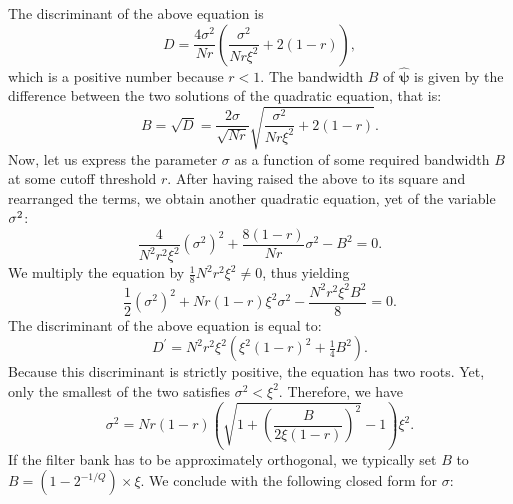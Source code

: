 \documentclass[smallextended]{svjour3}
\begin{document}
The discriminant of the above equation is
\[
D=\dfrac{4\sigma^2}{Nr}
\left(
\dfrac{\sigma^2}{Nr\xi^2}
+
2(1-r)
\right),
\]
which is a positive number because $r<1$.
The bandwidth $B$ of $\boldsymbol{\hat{\psi}}$ is given by the difference between the two solutions of the quadratic equation, that is:
\[
B = 
\sqrt{D} =
\dfrac{2\sigma}{\sqrt{N r}}
\sqrt{\dfrac{\sigma^2}{N r \xi^2} + 2 (1-r)}
.
\]
Now, let us express the parameter $\sigma$ as a function of some
required bandwidth $B$ at some cutoff threshold $r$. After having
raised the above to its square and rearranged the terms, we obtain
another quadratic equation, yet of the variable $\mbox{\ensuremath{\sigma}}^{2}$:
\[
\dfrac{4}{N^2 r^2 \xi^2} (\sigma^2)^2 + \dfrac{8 (1-r)}{N r} \sigma^2 - B^2 = 0.
\]
We multiply the equation by $\tfrac{1}{8} N^2 r^2 \xi^2 \neq 0$, thus yielding
\[
\dfrac{1}{2} (\sigma^2)^2
+
N r (1-r) \xi^2 \sigma^2
-
\dfrac{N^2 r^2 \xi^2 B^2}{8}
= 0.
\]
The discriminant of the above equation is equal to:
\[
D^\prime = N^2 r^2 \xi^2 \left(\xi^2 (1-r)^2 + \tfrac{1}{4}B^2\right).
\]
Because this discriminant is strictly positive, the equation has two roots.
Yet, only the smallest of the two satisfies $\sigma^2 < \xi^2$.
Therefore, we have
\[
\sigma^{2}=
N r (1-r)
\left(
\sqrt{1 + \left(\dfrac{B}{2\xi (1-r)}\right)^2}
- 1\right) \xi^2 
.
\]
If the filter bank has to be approximately orthogonal, we typically
set $B$ to $B=\left(1-2^{-1/Q}\right)\times\xi$.
We conclude with the following closed form for $\sigma$:
\end{document}

